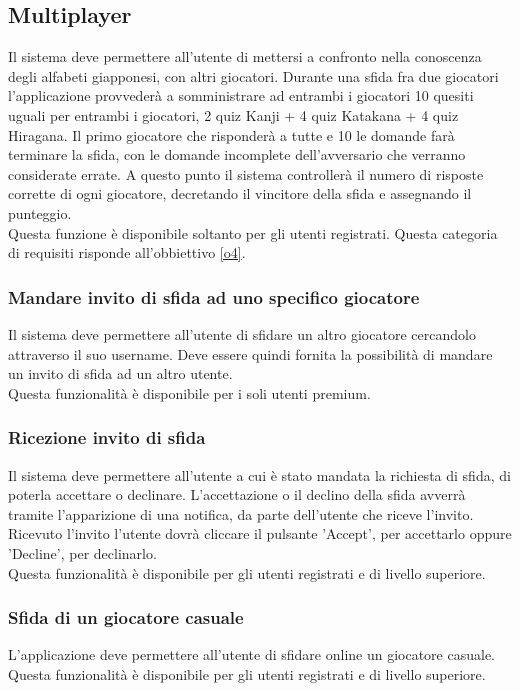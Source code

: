 \subsection{Multiplayer} \label{req_multiplayer}
Il sistema deve permettere all'utente di mettersi a confronto nella conoscenza degli alfabeti giapponesi, con altri giocatori. Durante una sfida fra due giocatori l'applicazione provvederà a somministrare ad entrambi i giocatori 10 quesiti uguali per entrambi i giocatori, 2 quiz Kanji + 4 quiz Katakana + 4 quiz Hiragana. Il primo giocatore che risponderà a tutte e 10 le domande farà terminare la sfida, con le domande incomplete dell'avversario che verranno considerate errate. A questo punto il sistema controllerà il numero di risposte corrette di ogni giocatore, decretando il vincitore della sfida e assegnando il punteggio. \\
Questa funzione è disponibile soltanto per gli utenti registrati. Questa categoria di requisiti risponde all'obbiettivo \ref{o4}.

\subsubsection{Mandare invito di sfida ad uno specifico giocatore} \label{req_invia_invito_sfida}
 Il sistema deve permettere all'utente di sfidare un altro giocatore cercandolo attraverso il suo username. Deve essere quindi fornita la possibilità di mandare un invito di sfida ad un altro utente. \\
 Questa funzionalità è disponibile per i soli utenti premium. 
 
 \subsubsection{Ricezione invito di sfida} \label{req_accetazione_invito_sfida}
 Il sistema deve permettere all'utente a cui è stato mandata la richiesta di sfida, di poterla accettare o declinare. L'accettazione o il declino della sfida avverrà tramite l'apparizione di una notifica, da parte dell'utente che riceve l'invito. Ricevuto l'invito l'utente dovrà cliccare il pulsante 'Accept', per accettarlo oppure 'Decline', per declinarlo. \\
 Questa funzionalità è disponibile per gli utenti registrati e di livello superiore.
 
 \subsubsection{Sfida di un giocatore casuale} \label{req_sfida_giocatore_casuale}
 L'applicazione deve permettere all'utente di sfidare online un giocatore casuale. \\
 Questa funzionalità è disponibile per gli utenti registrati e di livello superiore.
 
